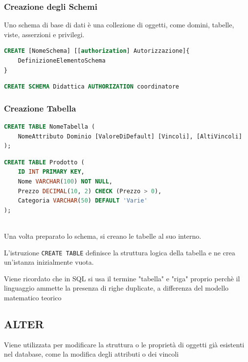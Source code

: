 \subsubsection{Creazione degli Schemi}
Uno schema di base di dati è una collezione di oggetti, come domini, tabelle, viste, asserzioni e privilegi.

\begin{lstlisting}[language=SQL, caption={questa è la sintassi della creazione di uno schema}]
CREATE [NomeSchema] [[authorization] Autorizzazione]{
    DefinizioneElementoSchema
}    
\end{lstlisting}
\begin{lstlisting}[language=SQL, caption={Questo è un esempio pratico di creazione di uno schema}]
CREATE SCHEMA Didattica AUTHORIZATION coordinatore
\end{lstlisting}
\subsubsection{Creazione Tabella}
\begin{lstlisting}[language=SQL, caption={Sintassi della creazione di una tabellea}]
CREATE TABLE NomeTabella (
    NomeAttributo Dominio [ValoreDiDefault] [Vincoli], [AltiVincoli]
);
\end{lstlisting}
\begin{lstlisting}[language=SQL, caption={Esempio pratico di creazione di una tabella}]
CREATE TABLE Prodotto (
    ID INT PRIMARY KEY,
    Nome VARCHAR(100) NOT NULL,    
    Prezzo DECIMAL(10, 2) CHECK (Prezzo > 0),
    Categoria VARCHAR(50) DEFAULT 'Varie'
);
    
\end{lstlisting}

Una volta preparato lo schema, si creano le tabelle al suo interno.

L'istruzione \texttt{CREATE TABLE} definisce la struttura logica della tabella e ne crea un'istanza inizialmente vuota.

Viene ricordato che in SQL si usa il termine "tabella" e "riga" proprio perchè il linguaggio ammette la presenza di righe duplicate, a differenza del modello matematico teorico


\subsection{ALTER}

Viene utilizzata per modificare la struttura o le proprietà di oggetti già esistenti nel database, come la modifica degli attributi o dei vincoli


